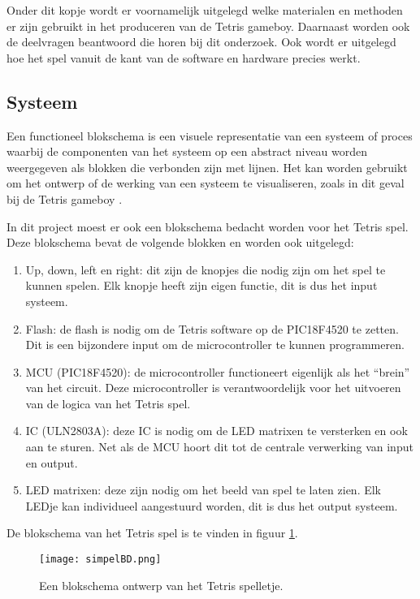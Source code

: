 Onder dit kopje wordt er voornamelijk uitgelegd welke materialen en methoden er zijn gebruikt in het produceren van de Tetris gameboy. 
Daarnaast worden ook de deelvragen beantwoord die horen bij dit onderzoek. Ook wordt er uitgelegd hoe het spel vanuit de kant van de software en hardware precies werkt.  
\subsection{Systeem}
\label{subsec:methoden:systeem}
Een functioneel blokschema is een visuele representatie van een systeem of proces waarbij de componenten van het systeem op een abstract niveau worden weergegeven als blokken die verbonden zijn met lijnen. 
Het kan worden gebruikt om het ontwerp of de werking van een systeem te visualiseren, zoals in dit geval bij de Tetris gameboy \cite{earle1999engineering}. 

In dit project moest er ook een blokschema bedacht worden voor het Tetris spel. Deze blokschema bevat de volgende blokken en worden ook uitgelegd:
\begin{enumerate}
    \item Up, down, left en right: dit zijn de knopjes die nodig zijn om het spel te kunnen spelen. Elk knopje heeft zijn eigen functie, dit is dus het input systeem.
    \item Flash: de flash is nodig om de Tetris software op de PIC18F4520 te zetten. Dit is een bijzondere input om de microcontroller te kunnen programmeren.
    \item MCU (PIC18F4520): de microcontroller functioneert eigenlijk als het ``brein'' van het circuit. Deze microcontroller is verantwoordelijk voor het uitvoeren van de logica van het Tetris spel.
    \item IC (ULN2803A): deze IC is nodig om de LED matrixen te versterken en ook aan te sturen. Net als de MCU hoort dit tot de centrale verwerking van input en output.
    \item LED matrixen: deze zijn nodig om het beeld van spel te laten zien. Elk LEDje kan individueel aangestuurd worden, dit is dus het output systeem.
\end{enumerate}
De blokschema van het Tetris spel is te vinden in figuur \ref{fig:bdSimpel}.
\begin{figure}[h]
\centering
\texttt{[image: simpelBD.png]}
\caption{Een blokschema ontwerp van het Tetris spelletje.}
\label{fig:bdSimpel}
\end{figure}

